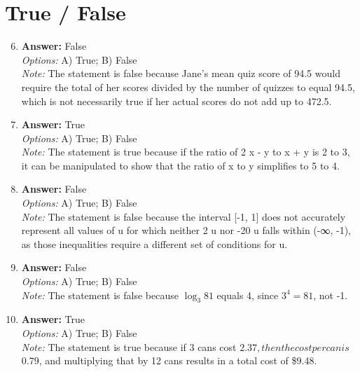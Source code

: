 \documentclass[12pt]{article}
\begin{document}
\section*{True / False}
\begin{enumerate}[label=\arabic*.]
\setcounter{enumi}{5}
\item \textbf{Answer:} False
\\ \textit{Options:} A) True; B) False
\\ \textit{Note:} The statement is false because Jane's mean quiz score of 94.5 would require the total of her scores divided by the number of quizzes to equal 94.5, which is not necessarily true if her actual scores do not add up to 472.5.
\item \textbf{Answer:} True
\\ \textit{Options:} A) True; B) False
\\ \textit{Note:} The statement is true because if the ratio of 2 x - y to x + y is 2 to 3, it can be manipulated to show that the ratio of x to y simplifies to 5 to 4.
\item \textbf{Answer:} False
\\ \textit{Options:} A) True; B) False
\\ \textit{Note:} The statement is false because the interval [-1, 1] does not accurately represent all values of u for which neither 2 u nor -20 u falls within (-∞, -1), as those inequalities require a different set of conditions for u.
\item \textbf{Answer:} False
\\ \textit{Options:} A) True; B) False
\\ \textit{Note:} The statement is false because $\log_3 81$ equals 4, since $3^4 = 81$, not -1.
\item \textbf{Answer:} True
\\ \textit{Options:} A) True; B) False
\\ \textit{Note:} The statement is true because if 3 cans cost $2.37, then the cost per can is $0.79, and multiplying that by 12 cans results in a total cost of \$9.48.
\end{enumerate}
\end{document}
